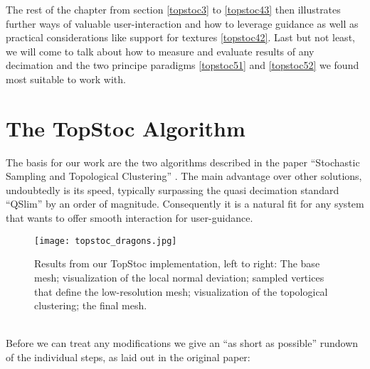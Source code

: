 The rest of the chapter from section \ref{topstoc3} to \ref{topstoc43} then illustrates further ways of valuable user-interaction and how to leverage guidance as well as practical considerations like support for textures \ref{topstoc42}.
Last but not least, we will come to talk about how to measure and evaluate results of any decimation and the two principe paradigms \ref{topstoc51} and \ref{topstoc52} we found most suitable to work with.


\section{The TopStoc Algorithm}
\label{topstoc1}

The basis for our work are the two algorithms described in the paper ``Stochastic Sampling and Topological Clustering'' \citep[cf.][]{Boubekeur2009}.
The main advantage over other solutions, undoubtedly is its speed, typically surpassing the quasi decimation standard ``QSlim'' by an order of magnitude.
Consequently it is a natural fit for any system that wants to offer smooth interaction for user-guidance. 
\begin{figure}[ht]
\centering
\texttt{[image: topstoc\_dragons.jpg]}
\caption{Results from our TopStoc implementation, left to right: The base mesh; visualization of the local normal deviation; sampled vertices that define the low-resolution mesh; visualization of the topological clustering; the final mesh.}
\label{fig:topstoc_dragons}
\end{figure}\\
Before we can treat any modifications we give an ``as short as possible'' rundown of the individual steps, as laid out in the original paper:
